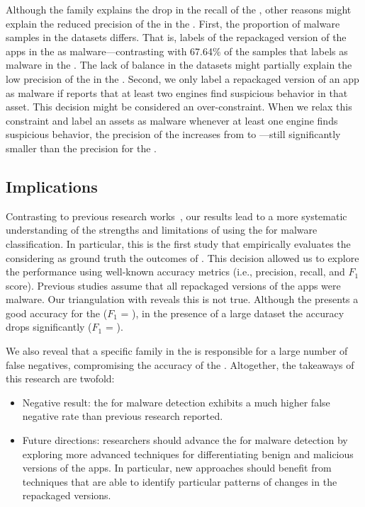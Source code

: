 Although the \gps family explains the drop in the recall of the \mas, other  reasons might explain the reduced precision of the \mas in the \cds. First, the proportion of malware samples in the
datasets differs. That is, \vt labels  of the repackaged version of the apps in the \cds as malware---contrasting with 67.64\% of the samples that \vt labels as malware in the \sds. The lack of balance in the datasets might partially explain the low precision of the \mas in the \cds. Second, we only label a repackaged version of an app as malware if \vt reports that at least two engines find suspicious behavior in that asset. This decision might be considered an over-constraint. When we relax this constraint and label an assets as malware whenever at least one engine finds suspicious behavior, the precision of the \mas increases from  to ---still significantly smaller than the \mas precision for the \sds.

\subsection{Implications}\label{sec:implications} 

Contrasting to previous research works~\cite{DBLP:conf/wcre/BaoLL18,DBLP:conf/iceccs/LeB0GL18,DBLP:journals/jss/CostaMMSSBNR22},
our results 
lead to a more systematic understanding
of the strengths and limitations of using the \mas
for malware classification. In particular, this is the
first study that empirically evaluates the \mas
considering as ground truth the outcomes
of \vt. This decision allowed us to explore the
\mas performance using well-known accuracy metrics (i.e., precision, recall, and
$F_1$ score). Previous studies assume that all repackaged versions of the
apps were malware. Our triangulation with \vt reveals this is not true. Although
the \mas presents a good accuracy for the \sds ($F_1$ = \fscoreSmall), 
in the presence of a large dataset the \mas accuracy drops significantly ($F_1$ = \fscore). 

We also reveal that a specific family in the \cds is responsible for a large number of false negatives,
compromising the accuracy of the \mas.
Altogether, the takeaways of this research are twofold:

\begin{itemize}
  \item Negative result: the \mas for malware detection exhibits a much higher false negative rate than previous research reported. 

  \item Future directions: researchers should advance the \mas for malware detection by exploring more advanced
    techniques for differentiating benign and malicious versions of the apps. In particular, new approaches should benefit from techniques
    that are able to identify particular patterns of changes in the repackaged versions. 
\end{itemize}  


